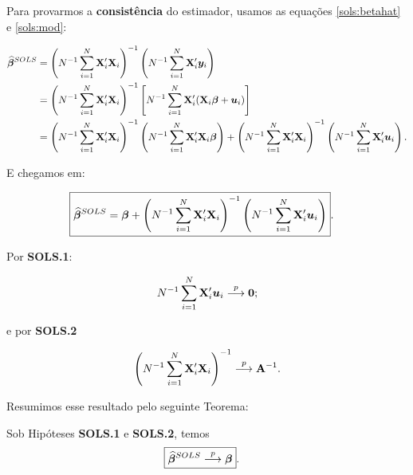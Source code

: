 \documentclass[11pt, oneside, a4paper, article]{article}
\numberwithin{equation}{section}
\begin{document}
Para provarmos a \textbf{consistência} do estimador, usamos as equações \eqref{sols:betahat} e \eqref{sols:mod}:

\vspace{-1 em}
\begin{align*}
	\widehat{\boldsymbol{\beta}}^{SOLS} &=
	\left( N^{-1}\sum_{i=1}^{N} \mathbf{X}_{i}' \mathbf{X}_{i}   \right)^{-1}
	\left( N^{-1}\sum_{i=1}^{N} \mathbf{X}_{i}' \boldsymbol{y}_{i}   \right)
	\\ &=
	\left( N^{-1}\sum_{i=1}^{N} \mathbf{X}_{i}' \mathbf{X}_{i}   \right)^{-1}
	\left[ N^{-1}\sum_{i=1}^{N} \mathbf{X}_{i}' (\mathbf{X}_{i} \boldsymbol{\beta} + \boldsymbol{u}_{i})   \right]
	\\ &=
	\left( N^{-1}\sum_{i=1}^{N} \mathbf{X}_{i}' \mathbf{X}_{i}   \right)^{-1}
	\left( N^{-1}\sum_{i=1}^{N} \mathbf{X}_{i}' \mathbf{X}_{i} \boldsymbol{\beta}    \right)
	+
	\left( N^{-1}\sum_{i=1}^{N} \mathbf{X}_{i}' \mathbf{X}_{i}   \right)^{-1}
	\left( N^{-1}\sum_{i=1}^{N} \mathbf{X}_{i}' \boldsymbol{u}_{i}   \right).
\end{align*}

\noindent
E chegamos em:

\vspace{-1 em}
\begin{align}\label{sols:betahat:u}
	\Aboxed{
		\betahatbold^{SOLS} &=
		\betavec
		+
		\left( N^{-1}\sum_{i=1}^{N} \Xmat_{i}' \Xmat_{i}   \right)^{-1}
		\left( N^{-1}\sum_{i=1}^{N} \Xmat_{i}' \uvec_{i}   \right)
	}.
\end{align}

Por \textbf{SOLS.1}:

\vspace{-1 em}
\begin{align*}
	N^{-1} \sum_{i=1}^{N} \mathbf{X}_{i}' \boldsymbol{u}_{i}  \overset{p}{\longrightarrow}  \boldsymbol{0};
\end{align*}

\noindent e por \textbf{SOLS.2}

\vspace{-1 em}
\begin{align*}
	\left( N^{-1} \sum_{i=1}^{N} \mathbf{X}_{i}' \mathbf{X}_{i} \right)^{-1}  \overset{p}{\longrightarrow}  \mathbf{A}^{-1}.
\end{align*}

Resumimos esse resultado pelo seguinte Teorema:

\begin{teo}\label{SOLS:const}
	Sob Hipóteses \textbf{SOLS.1} e \textbf{SOLS.2}, temos 
	\begin{align*}
		\Aboxed{
			\betahatbold^{SOLS} \arrowp \betavec
		}.
	\end{align*}
\end{teo}
\end{document}
